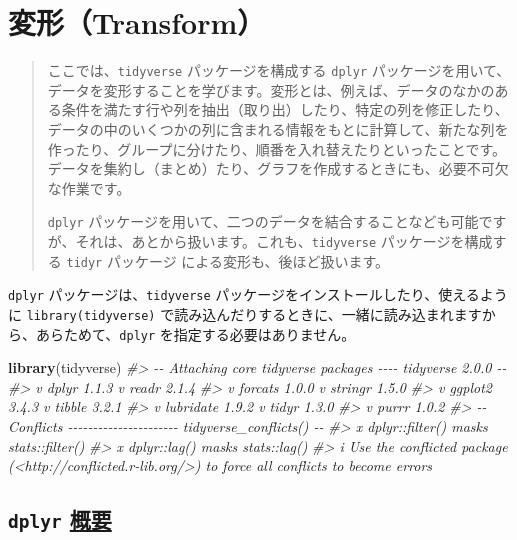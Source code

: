 \documentclass[
  xelatex, ja=standard]{bxjsbook}
\newenvironment{Shaded}{\begin{snugshade}}{\end{snugshade}}
\newcommand{\CommentTok}[1]{\textcolor[rgb]{0.56,0.35,0.01}{\textit{#1}}}
\newcommand{\FunctionTok}[1]{\textcolor[rgb]{0.13,0.29,0.53}{\textbf{#1}}}
\newcommand{\NormalTok}[1]{#1}
\theoremstyle{definition}
\theoremstyle{definition}
\theoremstyle{definition}
\theoremstyle{definition}
\theoremstyle{remark}
\begin{document}
\hypertarget{transform}{%
\chapter{変形（Transform）}\label{transform}}

\begin{quote}
ここでは、\texttt{tidyverse} パッケージを構成する \texttt{dplyr} パッケージを用いて、データを変形することを学びます。変形とは、例えば、データのなかのある条件を満たす行や列を抽出（取り出）したり、特定の列を修正したり、データの中のいくつかの列に含まれる情報をもとに計算して、新たな列を作ったり、グループに分けたり、順番を入れ替えたりといったことです。データを集約し（まとめ）たり、グラフを作成するときにも、必要不可欠な作業です。

\texttt{dplyr} パッケージを用いて、二つのデータを結合することなども可能ですが、それは、あとから扱います。これも、\texttt{tidyverse} パッケージを構成する \texttt{tidyr} パッケージ による変形も、後ほど扱います。
\end{quote}

\texttt{dplyr} パッケージは、\texttt{tidyverse} パッケージをインストールしたり、使えるように \texttt{library(tidyverse)} で読み込んだりするときに、一緒に読み込まれますから、あらためて、\texttt{dplyr} を指定する必要はありません。

\begin{Shaded}
\begin{Highlighting}[]
\FunctionTok{library}\NormalTok{(tidyverse)}
\CommentTok{\#\textgreater{} {-}{-} Attaching core tidyverse packages {-}{-}{-}{-} tidyverse 2.0.0 {-}{-}}
\CommentTok{\#\textgreater{} v dplyr     1.1.3     v readr     2.1.4}
\CommentTok{\#\textgreater{} v forcats   1.0.0     v stringr   1.5.0}
\CommentTok{\#\textgreater{} v ggplot2   3.4.3     v tibble    3.2.1}
\CommentTok{\#\textgreater{} v lubridate 1.9.2     v tidyr     1.3.0}
\CommentTok{\#\textgreater{} v purrr     1.0.2     }
\CommentTok{\#\textgreater{} {-}{-} Conflicts {-}{-}{-}{-}{-}{-}{-}{-}{-}{-}{-}{-}{-}{-}{-}{-}{-}{-}{-}{-}{-}{-} tidyverse\_conflicts() {-}{-}}
\CommentTok{\#\textgreater{} x dplyr::filter() masks stats::filter()}
\CommentTok{\#\textgreater{} x dplyr::lag()    masks stats::lag()}
\CommentTok{\#\textgreater{} i Use the conflicted package (\textless{}http://conflicted.r{-}lib.org/\textgreater{}) to force all conflicts to become errors}
\end{Highlighting}
\end{Shaded}

\hypertarget{dplyr-ux6982ux8981}{%
\section{\texorpdfstring{\texttt{dplyr} \href{https://dplyr.tidyverse.org}{概要}}{dplyr 概要}}\label{dplyr-ux6982ux8981}}
\end{document}
